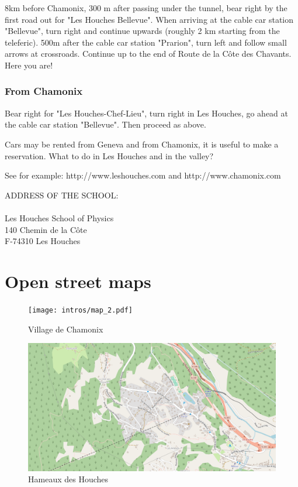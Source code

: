 8km before Chamonix, 300 m after passing under the tunnel, bear right
by the first road out for "Les Houches Bellevue". When arriving at the
cable car station "Bellevue", turn right and continue upwards (roughly
2 km starting from the teleferic). 500m after the cable car station
"Prarion", turn left and follow small arrows at crossroads. Continue
up to the end of Route de la Côte des Chavants. Here you are!

\subsection{From Chamonix}

Bear right for "Les Houches-Chef-Lieu", turn right in Les Houches, go ahead at the cable car station "Bellevue". Then proceed as above.

Cars may be rented from Geneva and from Chamonix, it is useful to make a reservation.
What to do in Les Houches and in the valley?

See for example: {\ttfamily http://www.leshouches.com} and
{\ttfamily http://www.chamonix.com}

\vspace{1cm}

ADDRESS OF THE SCHOOL:\\
\\
Les Houches School of Physics\\
140 Chemin de la Côte\\
F-74310 Les Houches\\

\chapter{Open street maps}


\begin{figure}[!ht]
  \texttt{[image: intros/map\_2.pdf]}  
  \caption{Village de Chamonix}
  \label{FIG1}
\end{figure}


\begin{figure}[!ht]
  \includegraphics[width=\textwidth]{intros/map_1.pdf}  
  \caption{Hameaux des Houches}
  \label{FIG1}
\end{figure}

